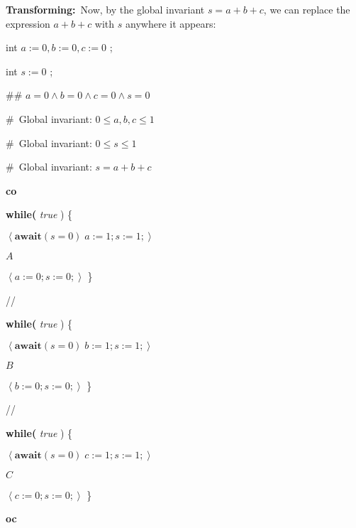 \documentclass[muchmore,11pt]{article}%
\begin{document}
\textbf{Transforming:}\ Now, by the global invariant $s=a+b+c$, we can replace
the expression $a+b+c$ with $s$ anywhere it appears:

\begin{code}
int $a:=0,b:=0,c:=0$ ;

int $s:=0$ ;

\#\# $a=0\wedge b=0\wedge c=0\wedge s=0$

\#\ Global invariant: $0\leq a,b,c\leq1$

\#\ Global invariant: $0\leq s\leq1$

\#\ Global invariant: $s=a+b+c$

\textbf{co}

\begin{indent}
\item \textbf{while(} \textit{true} ) \{

\begin{indent}
\item $\left\langle \mathbf{await}(s=0)\;a:=1;s:=1;\right\rangle $

\item $A$

\item $\left\langle a:=0;s:=0;\right\rangle $ \}
\end{indent}
\end{indent}

//

\begin{indent}
\item \textbf{while(} \textit{true} ) \{

\begin{indent}
\item $\left\langle \mathbf{await}(s=0)\;b:=1;s:=1;\right\rangle $

\item $B$

\item $\left\langle b:=0;s:=0;\right\rangle $ \}
\end{indent}
\end{indent}

//

\begin{indent}
\item \textbf{while(} \textit{true} ) \{

\begin{indent}
\item $\left\langle \mathbf{await}(s=0)\;c:=1;s:=1;\right\rangle $

\item $C$

\item $\left\langle c:=0;s:=0;\right\rangle $ \}
\end{indent}
\end{indent}

\textbf{oc}
\end{code}
\end{document}
